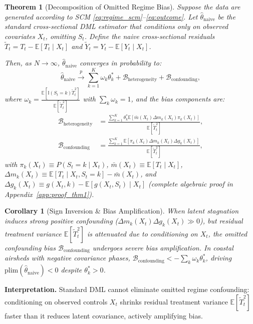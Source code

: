 \documentclass[twoside]{article}
\newtheorem{theorem}{Theorem}
\newtheorem{corollary}{Corollary}
\theoremstyle{definition}
\newcommand{\E}{\mathbb{E}}
\newcommand{\one}{\mathbb{I}}
\begin{document}
\begin{theorem}[Decomposition of Omitted Regime Bias]
\label{thm:bias}
Suppose the data are generated according to SCM \eqref{eq:regime_scm}--\eqref{eq:outcome}. Let $\hat{\theta}_{\mathrm{naive}}$ be the standard cross-sectional DML estimator \citep{chernozhukov2018double} that conditions only on observed covariates $X_t$, omitting $S_t$. Define the naive cross-sectional residuals $\tilde{T}_t = T_t - \E[T_t \mid X_t]$ and $\tilde{Y}_t = Y_t - \E[Y_t \mid X_t]$. 

Then, as $N \to \infty$, $\hat{\theta}_{\mathrm{naive}}$ converges in probability to:
\begin{equation}
    \hat{\theta}_{\mathrm{naive}} \xrightarrow{p} \sum_{k=1}^K \omega_k \theta_k^* + \mathcal{B}_{\mathrm{heterogeneity}} + \mathcal{B}_{\mathrm{confounding}},
\end{equation}
where $\omega_k = \frac{\E[\one(S_t = k) \tilde{T}_t^2]}{\E[\tilde{T}_t^2]}$ with $\sum_k \omega_k = 1$, and the bias components are:
\begin{align}
    \mathcal{B}_{\mathrm{heterogeneity}} &= \frac{\sum_{k=1}^K \theta_k^* \E\left[ \bar{m}(X_t) \Delta m_k(X_t) \pi_k(X_t) \right]}{\E[\tilde{T}_t^2]}, \label{eq:b_het} \\
    \mathcal{B}_{\mathrm{confounding}} &= \frac{\sum_{k=1}^K \E\left[ \pi_k(X_t) \Delta m_k(X_t) \Delta g_k(X_t) \right]}{\E[\tilde{T}_t^2]}, \label{eq:b_conf}
\end{align}
with $\pi_k(X_t) \equiv P(S_t = k \mid X_t)$, $\bar{m}(X_t) \equiv \E[T_t \mid X_t]$, $\Delta m_k(X_t) \equiv \E[T_t \mid X_t, S_t = k] - \bar{m}(X_t)$, and $\Delta g_k(X_t) \equiv g(X_t, k) - \E[g(X_t, S_t) \mid X_t]$ (complete algebraic proof in Appendix~\ref{app:proof_thm1}).
\end{theorem}

\begin{corollary}[Sign Inversion \& Bias Amplification]
When latent stagnation induces strong positive confounding ($\Delta m_k(X_t) \Delta g_k(X_t) \gg 0$), but residual treatment variance $\E[\tilde{T}_t^2]$ is attenuated due to conditioning on $X_t$, the omitted confounding bias $\mathcal{B}_{\mathrm{confounding}}$ undergoes severe \emph{bias amplification}. In coastal airsheds with negative covariance phases, $\mathcal{B}_{\mathrm{confounding}} < -\sum_k \omega_k \theta_k^*$, driving $\mathrm{plim}(\hat{\theta}_{\mathrm{naive}}) < 0$ despite $\theta_k^* > 0$.
\end{corollary}
\textbf{Interpretation.} Standard DML cannot eliminate omitted regime confounding: conditioning on observed controls $X_t$ shrinks residual treatment variance $\E[\tilde{T}_t^2]$ faster than it reduces latent covariance, actively amplifying bias.
\end{document}
